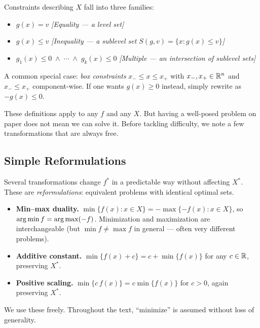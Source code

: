 \begin{defn}\label{def:constraint-types}
	Constraints describing $X$ fall into three families:
	\begin{itemize}
		\item $g(x) = v$ \hfill\textit{[Equality --- a level set]}
		\item $g(x) \leq v$ \hfill\textit{[Inequality --- a sublevel set $S(g, v) = \{x : g(x) \leq v\}$]}
		\item $g_1(x) \leq 0 \;\land\; \cdots \;\land\; g_k(x) \leq 0$
			\hfill\textit{[Multiple --- an intersection of sublevel sets]}
	\end{itemize}
	A common special case: \textit{box constraints} $x_- \leq x \leq x_+$ with $x_-, x_+ \in \mathbb{R}^n$ and $x_- \leq x_+$ component-wise.
	If one wants $g(x) \geq 0$ instead, simply rewrite as $-g(x) \leq 0$.
\end{defn}

These definitions apply to any $f$ and any $X$.
But having a well-posed problem on paper does not mean we can solve it.
Before tackling difficulty, we note a few transformations that are always free.

\subsection{Simple Reformulations}\label{ssec:reformulations}

Several transformations change $f^*$ in a predictable way without affecting $X^*$.
These are \textit{reformulations}: equivalent problems with identical optimal sets.

\begin{itemize}
	\item \textbf{Min--max duality.}
		$\min\{f(x) : x \in X\} = -\max\{-f(x) : x \in X\}$,
		so $\operatorname*{arg\,min} f = \operatorname*{arg\,max}(-f)$.
		Minimization and maximization are interchangeable (but $\min f \neq \max f$ in general --- often very different problems).
	\item \textbf{Additive constant.}
		$\min\{f(x) + c\} = c + \min\{f(x)\}$ for any $c \in \mathbb{R}$, preserving $X^*$.
	\item \textbf{Positive scaling.}
		$\min\{c\, f(x)\} = c \min\{f(x)\}$ for $c > 0$, again preserving $X^*$.
\end{itemize}

We use these freely.
Throughout the text, ``minimize'' is assumed without loss of generality.

